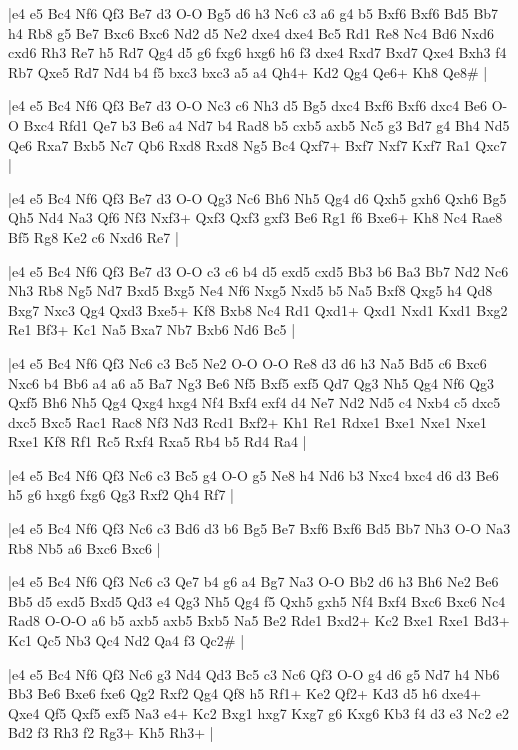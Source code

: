 \whitename{}
\blackname{}
\makegametitle
|e4 e5 Bc4 Nf6 Qf3 Be7 d3 O-O Bg5 d6 h3 Nc6 c3 a6 g4 b5 Bxf6 Bxf6 Bd5 Bb7 h4 Rb8 g5 Be7 Bxc6 Bxc6 Nd2 d5 Ne2 dxe4 dxe4 Bc5 Rd1 Re8 Nc4 Bd6 Nxd6 cxd6 Rh3 Re7 h5 Rd7 Qg4 d5 g6 fxg6 hxg6 h6 f3 dxe4 Rxd7 Bxd7 Qxe4 Bxh3 f4 Rb7 Qxe5 Rd7 Nd4 b4 f5 bxc3 bxc3 a5 a4 Qh4+ Kd2 Qg4 Qe6+ Kh8 Qe8\#  |

\whitename{}
\blackname{}
\makegametitle
|e4 e5 Bc4 Nf6 Qf3 Be7 d3 O-O Nc3 c6 Nh3 d5 Bg5 dxc4 Bxf6 Bxf6 dxc4 Be6 O-O Bxc4 Rfd1 Qe7 b3 Be6 a4 Nd7 b4 Rad8 b5 cxb5 axb5 Nc5 g3 Bd7 g4 Bh4 Nd5 Qe6 Rxa7 Bxb5 Nc7 Qb6 Rxd8 Rxd8 Ng5 Bc4 Qxf7+ Bxf7 Nxf7 Kxf7 Ra1 Qxc7  |

\whitename{}
\blackname{}
\makegametitle
|e4 e5 Bc4 Nf6 Qf3 Be7 d3 O-O Qg3 Nc6 Bh6 Nh5 Qg4 d6 Qxh5 gxh6 Qxh6 Bg5 Qh5 Nd4 Na3 Qf6 Nf3 Nxf3+ Qxf3 Qxf3 gxf3 Be6 Rg1 f6 Bxe6+ Kh8 Nc4 Rae8 Bf5 Rg8 Ke2 c6 Nxd6 Re7  |

\whitename{}
\blackname{}
\makegametitle
|e4 e5 Bc4 Nf6 Qf3 Be7 d3 O-O c3 c6 b4 d5 exd5 cxd5 Bb3 b6 Ba3 Bb7 Nd2 Nc6 Nh3 Rb8 Ng5 Nd7 Bxd5 Bxg5 Ne4 Nf6 Nxg5 Nxd5 b5 Na5 Bxf8 Qxg5 h4 Qd8 Bxg7 Nxc3 Qg4 Qxd3 Bxe5+ Kf8 Bxb8 Nc4 Rd1 Qxd1+ Qxd1 Nxd1 Kxd1 Bxg2 Re1 Bf3+ Kc1 Na5 Bxa7 Nb7 Bxb6 Nd6 Bc5  |

\whitename{}
\blackname{}
\makegametitle
|e4 e5 Bc4 Nf6 Qf3 Nc6 c3 Bc5 Ne2 O-O O-O Re8 d3 d6 h3 Na5 Bd5 c6 Bxc6 Nxc6 b4 Bb6 a4 a6 a5 Ba7 Ng3 Be6 Nf5 Bxf5 exf5 Qd7 Qg3 Nh5 Qg4 Nf6 Qg3 Qxf5 Bh6 Nh5 Qg4 Qxg4 hxg4 Nf4 Bxf4 exf4 d4 Ne7 Nd2 Nd5 c4 Nxb4 c5 dxc5 dxc5 Bxc5 Rac1 Rac8 Nf3 Nd3 Rcd1 Bxf2+ Kh1 Re1 Rdxe1 Bxe1 Nxe1 Nxe1 Rxe1 Kf8 Rf1 Rc5 Rxf4 Rxa5 Rb4 b5 Rd4 Ra4  |

\whitename{}
\blackname{}
\makegametitle
|e4 e5 Bc4 Nf6 Qf3 Nc6 c3 Bc5 g4 O-O g5 Ne8 h4 Nd6 b3 Nxc4 bxc4 d6 d3 Be6 h5 g6 hxg6 fxg6 Qg3 Rxf2 Qh4 Rf7  |

\whitename{}
\blackname{}
\makegametitle
|e4 e5 Bc4 Nf6 Qf3 Nc6 c3 Bd6 d3 b6 Bg5 Be7 Bxf6 Bxf6 Bd5 Bb7 Nh3 O-O Na3 Rb8 Nb5 a6 Bxc6 Bxc6  |

\whitename{}
\blackname{}
\makegametitle
|e4 e5 Bc4 Nf6 Qf3 Nc6 c3 Qe7 b4 g6 a4 Bg7 Na3 O-O Bb2 d6 h3 Bh6 Ne2 Be6 Bb5 d5 exd5 Bxd5 Qd3 e4 Qg3 Nh5 Qg4 f5 Qxh5 gxh5 Nf4 Bxf4 Bxc6 Bxc6 Nc4 Rad8 O-O-O a6 b5 axb5 axb5 Bxb5 Na5 Be2 Rde1 Bxd2+ Kc2 Bxe1 Rxe1 Bd3+ Kc1 Qc5 Nb3 Qc4 Nd2 Qa4 f3 Qc2\#  |

\whitename{}
\blackname{}
\makegametitle
|e4 e5 Bc4 Nf6 Qf3 Nc6 g3 Nd4 Qd3 Bc5 c3 Nc6 Qf3 O-O g4 d6 g5 Nd7 h4 Nb6 Bb3 Be6 Bxe6 fxe6 Qg2 Rxf2 Qg4 Qf8 h5 Rf1+ Ke2 Qf2+ Kd3 d5 h6 dxe4+ Qxe4 Qf5 Qxf5 exf5 Na3 e4+ Kc2 Bxg1 hxg7 Kxg7 g6 Kxg6 Kb3 f4 d3 e3 Nc2 e2 Bd2 f3 Rh3 f2 Rg3+ Kh5 Rh3+  |

